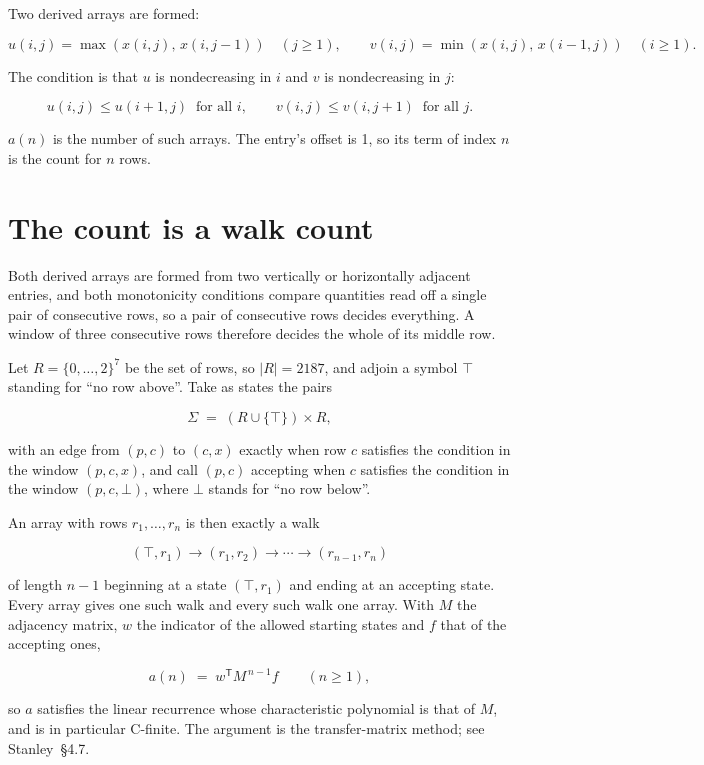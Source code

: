 \documentclass[11pt]{article}
\theoremstyle{definition}
\begin{document}
Two derived arrays are formed:

\[u(i,j) = \max(x(i,j),\,x(i,j{-}1))\quad (j \ge 1), \qquad v(i,j) = \min(x(i,j),\,x(i{-}1,j))\quad (i \ge 1).\]

The condition is that $u$ is nondecreasing in $i$ and $v$ is nondecreasing in $j$:

\[u(i,j) \le u(i{+}1,j) \ \text{ for all } i, \qquad v(i,j) \le v(i,j{+}1) \ \text{ for all } j.\]

$a(n)$ is the number of such arrays. The entry's offset is 1, so its term of index $n$ is the count for $n$ rows.

\section{The count is a walk count}

Both derived arrays are formed from two vertically or horizontally adjacent entries, and both monotonicity conditions compare quantities read off a single pair of consecutive rows, so a pair of consecutive rows decides everything. A window of three consecutive rows therefore decides the whole of its middle row.

Let $R = \{0,\dots,2\}^{7}$ be the set of rows, so $|R| = 2187$, and adjoin a symbol $\top$ standing for ``no row above''. Take as states the pairs

\[\Sigma \;=\; (R \cup \{\top\}) \times R,\]

with an edge from $(p,c)$ to $(c,x)$ exactly when row $c$ satisfies the condition in the window $(p,c,x)$, and call $(p,c)$ accepting when $c$ satisfies the condition in the window $(p,c,\bot)$, where $\bot$ stands for ``no row below''.

An array with rows $r_1,\dots,r_n$ is then exactly a walk

\[(\top,r_1) \to (r_1,r_2) \to \cdots \to (r_{n-1},r_n)\]

of length $n-1$ beginning at a state $(\top,r_1)$ and ending at an accepting state. Every array gives one such walk and every such walk one array. With $M$ the adjacency matrix, $w$ the indicator of the allowed starting states and $f$ that of the accepting ones,

\[a(n) \;=\; w^{\mathsf T} M^{\,n-1} f \qquad (n \ge 1),\]

so $a$ satisfies the linear recurrence whose characteristic polynomial is that of $M$, and is in particular C-finite. The argument is the transfer-matrix method; see Stanley~\S4.7.
\end{document}
